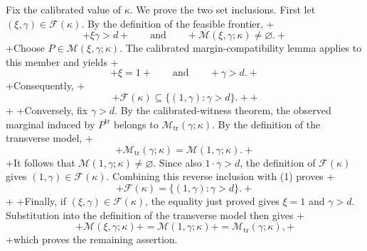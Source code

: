 Fix the calibrated value of \(\kappa\). We prove the two set inclusions. First let \((\xi,\gamma)\in\mathcal F(\kappa)\). By the definition of the feasible frontier,
+\[
+\xi\gamma>d
+\qquad\text{and}\qquad
+\mathcal M(\xi,\gamma;\kappa)\ne\varnothing.
+\]
+Choose \(P\in\mathcal M(\xi,\gamma;\kappa)\). The calibrated margin-compatibility lemma applies to this member and yields
+\[
+\xi=1
+\qquad\text{and}\qquad
+\gamma>d.
+\]
+Consequently,
+\[
+\mathcal F(\kappa)\subseteq\{(1,\gamma):\gamma>d\}.
+\tag{1}
+\]
+
+Conversely, fix \(\gamma>d\). By the calibrated-witness theorem, the observed marginal induced by \(P^{\mathrm{tr}}\) belongs to \(\mathcal M_{\mathrm{tr}}(\gamma;\kappa)\). By the definition of the transverse model,
+\[
+\mathcal M_{\mathrm{tr}}(\gamma;\kappa)=\mathcal M(1,\gamma;\kappa).
+\]
+It follows that \(\mathcal M(1,\gamma;\kappa)\ne\varnothing\). Since also \(1\cdot\gamma>d\), the definition of \(\mathcal F(\kappa)\) gives \((1,\gamma)\in\mathcal F(\kappa)\). Combining this reverse inclusion with (1) proves
+\[
+\mathcal F(\kappa)=\{(1,\gamma):\gamma>d\}.
+\]
+
+Finally, if \((\xi,\gamma)\in\mathcal F(\kappa)\), the equality just proved gives \(\xi=1\) and \(\gamma>d\). Substitution into the definition of the transverse model then gives
+\[
+\mathcal M(\xi,\gamma;\kappa)
+=\mathcal M(1,\gamma;\kappa)
+=\mathcal M_{\mathrm{tr}}(\gamma;\kappa),
+\]
+which proves the remaining assertion.